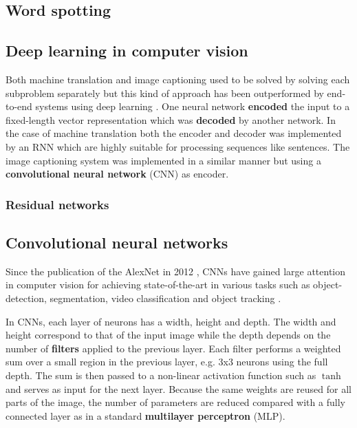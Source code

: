 \subsection{Word spotting}


\subsection{Deep learning in computer vision}

Both machine translation and image captioning used to be solved by solving each subproblem separately but this kind of approach has been outperformed by end-to-end systems using deep learning \cite{ShowAndTell}. One neural network \textbf{encoded} the input to a fixed-length vector representation which was \textbf{decoded} by another network. In the case of machine translation both the encoder and decoder was implemented by an RNN which are highly suitable for processing sequences like sentences. The image captioning system was implemented in a similar manner but using a \textbf{convolutional neural network} (CNN) as encoder.

\subsubsection{Residual networks}


\subsection{Convolutional neural networks}

Since the publication of the AlexNet in 2012 \cite{AlexNet}, CNNs have gained large attention in computer vision for achieving state-of-the-art in various tasks such as object-detection, segmentation, video classification and object tracking \cite{InceptionV3}.


In CNNs, each layer of neurons has a width, height and depth. The width and height correspond to that of the input image while the depth depends on the number of \textbf{filters} applied to the previous layer.
Each filter performs a weighted sum over a small region in the previous layer, e.g. 3x3 neurons using the full depth. The sum is then passed to a non-linear activation function such as $\tanh$ and serves as input for the next layer.
Because the same weights are reused for all parts of the image, the number of parameters are reduced compared with a fully connected layer as in a standard \textbf{multilayer perceptron} (MLP).

